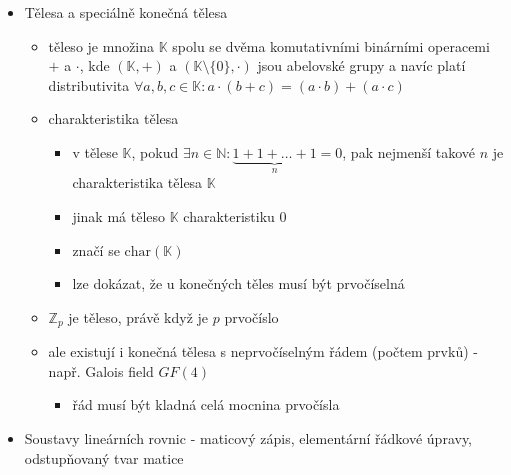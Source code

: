 \begin{itemize}
\begin{itemize}
\begin{itemize}
\item jakoukoliv permutaci lze rozložit na transpozice
\begin{itemize}
\item cyklus $(1,2,3,4)$ lze rozložit na $(1,4)\circ(1,3)\circ(1,2)$ nebo na $(1,2)\circ(2,3)\circ(3,4)$
\end{itemize}
\item znaménko permutace $p$ je $\text{sgn}(p)=(-1)^{\text{po\text{č}et inverz\text{í} v}\ p}$
\begin{itemize}
\item inverze v $p$ je dvojice prvků $(i,j):i \lt j \land p(i) \gt p(j)$
\item nebo také $\text{sgn}(p)=(-1)^{\text{po\text{č}et transpozic v}\ p}$
\end{itemize}
\end{itemize}
\end{itemize}
\item Tělesa a speciálně konečná tělesa
\begin{itemize}
\item těleso je množina $\mathbb K$ spolu se dvěma komutativními binárními operacemi $+$ a $\cdot$, kde $(\mathbb K, +)$ a $(\mathbb K \setminus \lbrace0\rbrace, \cdot)$ jsou abelovské grupy a navíc platí distributivita $\forall a,b,c \in \mathbb K : a\cdot (b+c)=(a\cdot b)+(a\cdot c)$
\item charakteristika tělesa
\begin{itemize}
\item v tělese $\mathbb K$, pokud $\exists n \in \mathbb N: \underbrace{1+1+\dots+1}_{n}=0$, pak nejmenší takové $n$ je charakteristika tělesa $\mathbb K$
\item jinak má těleso $\mathbb K$ charakteristiku 0
\item značí se $\text{char}(\mathbb K)$
\item lze dokázat, že u konečných těles musí být prvočíselná
\end{itemize}
\item $\mathbb Z_p$ je těleso, právě když je $p$ prvočíslo
\item ale existují i konečná tělesa s neprvočíselným řádem (počtem prvků) - např. Galois field $GF(4)$
\begin{itemize}
\item řád musí být kladná celá mocnina prvočísla
\end{itemize}
\end{itemize}
\item Soustavy lineárních rovnic - maticový zápis, elementární řádkové úpravy, odstupňovaný tvar matice

\end{itemize}
